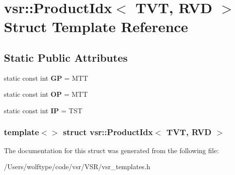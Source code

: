 \hypertarget{structvsr_1_1_product_idx_3_01_t_v_t_00_01_r_v_d_01_4}{\section{vsr\-:\-:Product\-Idx$<$ T\-V\-T, R\-V\-D $>$ Struct Template Reference}
\label{structvsr_1_1_product_idx_3_01_t_v_t_00_01_r_v_d_01_4}
}
\subsection*{Static Public Attributes}
\begin{DoxyCompactItemize}
\item 
\hypertarget{structvsr_1_1_product_idx_3_01_t_v_t_00_01_r_v_d_01_4_a863a6e8a541938c320c2cbc7034f3d51}{static const int {\bfseries G\-P} = M\-T\-T}\label{structvsr_1_1_product_idx_3_01_t_v_t_00_01_r_v_d_01_4_a863a6e8a541938c320c2cbc7034f3d51}

\item 
\hypertarget{structvsr_1_1_product_idx_3_01_t_v_t_00_01_r_v_d_01_4_ab8466323347e3ed96d815e46836ee9f2}{static const int {\bfseries O\-P} = M\-T\-T}\label{structvsr_1_1_product_idx_3_01_t_v_t_00_01_r_v_d_01_4_ab8466323347e3ed96d815e46836ee9f2}

\item 
\hypertarget{structvsr_1_1_product_idx_3_01_t_v_t_00_01_r_v_d_01_4_ade1e82fa78be255c2e7f9cddd1c375e5}{static const int {\bfseries I\-P} = T\-S\-T}\label{structvsr_1_1_product_idx_3_01_t_v_t_00_01_r_v_d_01_4_ade1e82fa78be255c2e7f9cddd1c375e5}

\end{DoxyCompactItemize}
\subsubsection*{template$<$$>$ struct vsr\-::\-Product\-Idx$<$ T\-V\-T, R\-V\-D $>$}



The documentation for this struct was generated from the following file\-:\begin{DoxyCompactItemize}
\item 
/\-Users/wolftype/code/vsr/\-V\-S\-R/vsr\-\_\-templates.\-h\end{DoxyCompactItemize}
